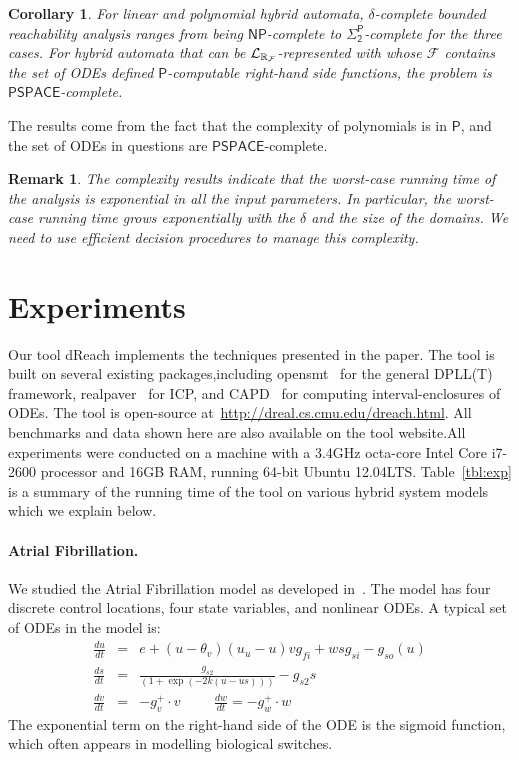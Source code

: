 \documentclass[journal]{IEEEtran}
\newtheorem{remark}{Remark}
\newtheorem{corollary}{Corollary}
\begin{document}
\begin{corollary}
For linear and polynomial hybrid automata, $\delta$-complete bounded reachability analysis ranges from being $\mathsf{NP}$-complete to $\mathsf{\Sigma_2^P}$-complete for the three cases. For hybrid automata that can be $\mathcal{L}_{\mathbb{R}_{\mathcal{F}}}$-represented with whose $\mathcal{F}$ contains the set of ODEs defined $\mathsf{P}$-computable right-hand side functions, the problem is $\mathsf{PSPACE}$-complete.
\end{corollary}
The results come from the fact that the complexity of polynomials is in $\mathsf{P}$, and the set of ODEs in questions are $\mathsf{PSPACE}$-complete.
\begin{remark}
The complexity results indicate that the worst-case running time of the analysis is exponential in all the input parameters. In particular, the worst-case running time grows exponentially with the $\delta$ and the size of the domains. We need to use efficient decision procedures to manage this complexity.
\end{remark}

\section{Experiments}


Our tool {\sf dReach} implements the techniques presented in the
paper. The tool is built on several existing packages,including {\sf
  opensmt}~\cite{DBLP:conf/tacas/BruttomessoPST10} for the general
DPLL(T) framework, {\sf
  realpaver}~\cite{DBLP:journals/toms/GranvilliersB06} for ICP, and
{\sf CAPD}~\cite{capd} for computing interval-enclosures of ODEs. The
tool is open-source at~\url{http://dreal.cs.cmu.edu/dreach.html}. All
benchmarks and data shown here are also available on the tool
website.All experiments were conducted on a machine with a 3.4GHz
octa-core Intel Core i7-2600 processor and 16GB RAM, running 64-bit
Ubuntu 12.04LTS. Table~\ref{tbl:exp} is a summary of the running time
of the tool on various hybrid system models which we explain below.

\paragraph{Atrial Fibrillation.} We studied the Atrial Fibrillation model as developed in~\cite{DBLP:conf/cav/GrosuBFGGSB11}. The model has four discrete control locations, four state variables, and nonlinear ODEs. A typical set of ODEs in the model is:
\begin{eqnarray*}
\frac{du}{dt} &=& e + (u-\theta_v)(u_u-u ) v g_{fi} + wsg_{si}-g_{so}(u)\\
\frac{ds}{dt} &=& \displaystyle\frac{g_{s2}}{(1+\exp(-2k(u-us)))} -  g_{s2}s\\
\frac{dv}{dt} &=& -g_v^+\cdot v \hspace{1cm} \frac{dw}{dt} = -g_w^+\cdot w
\end{eqnarray*}
The exponential term on the right-hand side of the ODE is the sigmoid function, which often appears in modelling biological switches.
\end{document}
